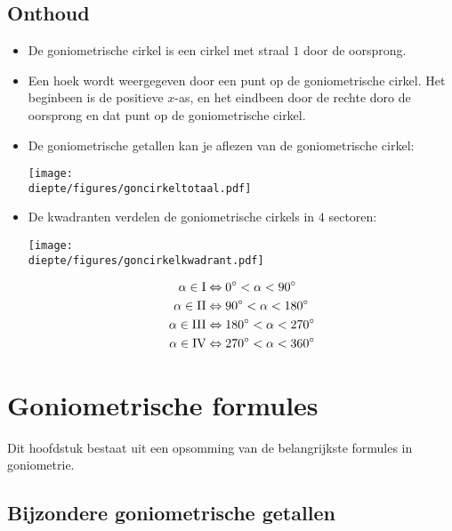 \documentclass[a4paper,12pt]{article}
\newcommand{\diepte}{./}
\begin{document}
\subsection{Onthoud}

\begin{framed}
\begin{itemize}
	\item De goniometrische cirkel is een cirkel met straal $1$ door de oorsprong.
	\item Een hoek wordt weergegeven door een punt op de goniometrische cirkel. Het beginbeen is de positieve $x$-as, en het eindbeen door de rechte doro de oorsprong en dat punt op de goniometrische cirkel.
	\item De goniometrische getallen kan je aflezen van de goniometrische cirkel:
	\begin{center}
\texttt{[image: \\diepte/figures/goncirkeltotaal.pdf]}
\end{center}
	\item De kwadranten verdelen de goniometrische cirkels in $4$ sectoren:
	\begin{center}
\texttt{[image: \\diepte/figures/goncirkelkwadrant.pdf]}
\end{center}
\begin{align*}
\alpha \in \textup{I} &\Leftrightarrow 0^\circ < \alpha < 90^\circ\\
\alpha \in \textup{II} &\Leftrightarrow 90^\circ < \alpha < 180^\circ\\
\alpha \in \textup{III} &\Leftrightarrow 180^\circ < \alpha < 270^\circ\\
\alpha \in \textup{IV} &\Leftrightarrow 270^\circ < \alpha < 360^\circ
\end{align*}
\end{itemize}
\end{framed}

\newpage

\section{Goniometrische formules}

Dit hoofdstuk bestaat uit een opsomming van de belangrijkste formules in goniometrie.

\subsection{Bijzondere goniometrische getallen}
\end{document}
